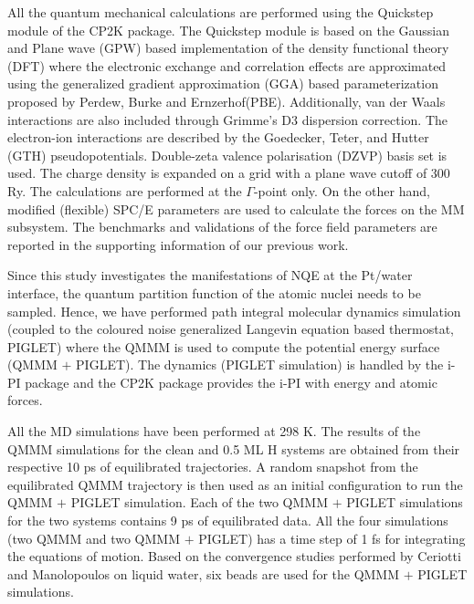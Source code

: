 All the quantum mechanical calculations are performed using the Quickstep\cite{kuhne2020cp2k} module of the CP2K package. The Quickstep module is based on the Gaussian and Plane wave (GPW) based implementation of the density functional theory (DFT) where the electronic exchange and correlation effects are approximated using the generalized gradient approximation (GGA) based parameterization proposed by Perdew, Burke and Ernzerhof\cite{GGA-PBE1996}(PBE). Additionally, van der Waals interactions are also included through Grimme's D3 dispersion correction\cite{grimme2010consistent}. The electron-ion interactions are described by the Goedecker, Teter, and Hutter\cite{goedecker1996separable} (GTH) pseudopotentials. Double-zeta valence polarisation (DZVP) basis set is used.
The charge density is expanded on a grid with a plane wave cutoff of 300 Ry. The calculations are performed at the $\Gamma$-point only. On the other hand, modified (flexible) SPC/E parameters are used to calculate the forces on the MM subsystem. The benchmarks and validations of the force field parameters are reported in the supporting information of our previous work\cite{hardikar2019theoretical}. 

Since this study investigates the manifestations of NQE at the Pt/water interface, the quantum partition function of the atomic nuclei needs to be sampled. Hence, we have
performed path integral molecular dynamics simulation (coupled to the coloured noise generalized Langevin equation based thermostat, PIGLET\cite{ceriotti2012efficient}) where the QMMM is used to compute the potential energy surface (QMMM $+$ PIGLET). The dynamics (PIGLET simulation) is handled by the i-PI package\cite{kapil2019pi} and the CP2K package provides the i-PI with energy and atomic forces. 

All the MD simulations have been performed at 298 K. The results of the QMMM 
simulations for the clean and 0.5 ML H systems are obtained from their respective 10 ps 
of equilibrated trajectories. A random snapshot from the equilibrated QMMM 
trajectory is then used
as an initial configuration to run the QMMM $+$ PIGLET simulation. Each of the two 
QMMM $+$ PIGLET simulations for the two systems contains 9 ps of equilibrated data. 
All the four simulations (two QMMM and two QMMM $+$ PIGLET) has a time step of 1 fs 
for integrating the equations of motion. Based on the convergence studies performed by Ceriotti and 
Manolopoulos\cite{ceriotti2012efficient} on liquid water, six beads are used for the
QMMM $+$ PIGLET simulations.

